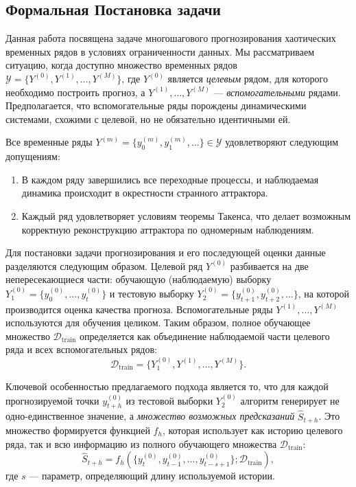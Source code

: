 \documentclass[a4paper,12pt]{extarticle}
\begin{document}
\subsection{Формальная Постановка задачи}

Данная работа посвящена задаче многошагового прогнозирования хаотических
 временных рядов в условиях ограниченности данных. Мы рассматриваем ситуацию,
  когда доступно множество временных рядов $\mathcal{Y} = \{Y^{(0)}, Y^{(1)},
   \dots, Y^{(M)}\}$, где $Y^{(0)}$ является \textit{целевым} рядом, для которого
    необходимо построить прогноз, а $Y^{(1)}, \dots, Y^{(M)}$ — \textit{вспомогательными} рядами.
     Предполагается, что вспомогательные ряды порождены динамическими системами,
      схожими с целевой, но не обязательно идентичными ей.

Все временные ряды $Y^{(m)} = \{y_0^{(m)}, y_1^{(m)}, \dots\} \in \mathcal{Y}$ удовлетворяют следующим допущениям:
\begin{enumerate}
    \item В каждом ряду завершились все переходные процессы, и наблюдаемая
    динамика происходит в окрестности странного аттрактора.
    \item Каждый ряд удовлетворяет условиям теоремы Такенса\cite{Takens1981}, что делает
    возможным корректную реконструкцию аттрактора по одномерным наблюдениям.
\end{enumerate}

Для постановки задачи прогнозирования и его последующей оценки данные разделяются
 следующим образом. Целевой ряд $Y^{(0)}$ разбивается на две непересекающиеся части:
  обучающую (наблюдаемую) выборку $Y_1^{(0)} = \{y_0^{(0)}, \dots, y_t^{(0)}\}$ и
   тестовую выборку $Y_2^{(0)} = \{y_{t+1}^{(0)}, y_{t+2}^{(0)}, \dots\}$, на которой
    производится оценка качества прогноза. Вспомогательные ряды $Y^{(1)}, \dots, Y^{(M)}$
     используются для обучения целиком. Таким образом, полное обучающее множество
     $\mathcal{D}_{\text{train}}$ определяется как объединение наблюдаемой части
      целевого ряда и всех вспомогательных рядов:
\[
\mathcal{D}_{\text{train}} = \{Y_1^{(0)}, Y^{(1)}, \dots, Y^{(M)}\}.
\]

Ключевой особенностью предлагаемого подхода является то, что для каждой
 прогнозируемой точки $y_{t+h}^{(0)}$ из тестовой выборки $Y_2^{(0)}$ алгоритм
  генерирует не одно-единственное значение, а \textit{множество возможных предсказаний}
   $\hat{S}_{t+h}$. Это множество формируется функцией $f_h$, которая использует
   как историю целевого ряда, так и всю информацию из полного обучающего множества $\mathcal{D}_{\text{train}}$:
\[
\hat{S}_{t+h} = f_h\left(\{y_t^{(0)}, y_{t-1}^{(0)}, \dots, y_{t-s+1}^{(0)}\}; \mathcal{D}_{\text{train}}\right),
\]
где $s$ — параметр, определяющий длину используемой истории.
\end{document}
